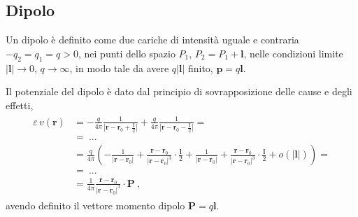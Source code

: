 \documentclass[letterpaper,10pt,italian]{jupyterBook}
\begin{document}
\subsection{Dipolo}
\label{\detokenize{ch/numerical-methods:dipolo}}
\sphinxAtStartPar
Un dipolo è definito come due cariche di intensità uguale e contraria \(-q_2 = q_1 = q > 0\), nei punti dello spazio \(P_1\), \(P_2 = P_1 + \mathbf{l}\), nelle condizioni limite \(|\mathbf{l}| \rightarrow 0\), \(q \rightarrow \infty\), in modo tale da avere \(q |\mathbf{l}|\) finito, \(\mathbf{p} = q \mathbf{l}\).

\sphinxAtStartPar
Il potenziale del dipolo è dato dal principio di sovrapposizione delle cause e degli effetti,
\begin{equation*}
\begin{split}\begin{aligned}
  \varepsilon \, v(\mathbf{r})
  & = - \frac{q}{4 \pi }\frac{1}{\left|\mathbf{r} - \mathbf{r}_0 + \frac{\mathbf{l}}{2} \right|} 
      + \frac{q}{4 \pi }\frac{1}{\left|\mathbf{r} - \mathbf{r}_0 - \frac{\mathbf{l}}{2} \right|} = \\
  & = \ ... \\
  & = \frac{q}{4 \pi} \left( 
  - \frac{1}{\left|\mathbf{r} - \mathbf{r}_0 \right|} + \frac{\mathbf{r} - \mathbf{r}_0}{\left|\mathbf{r} - \mathbf{r}_0 \right|^3} \cdot \frac{\mathbf{l}}{2}
  + \frac{1}{\left|\mathbf{r} - \mathbf{r}_0 \right|} + \frac{\mathbf{r} - \mathbf{r}_0}{\left|\mathbf{r} - \mathbf{r}_0 \right|^3} \cdot \frac{\mathbf{l}}{2} + o(|\mathbf{l}|) \right) = \\
  & = \ ... \\
  & = \frac{1}{4 \pi}
 \frac{\mathbf{r} - \mathbf{r}_0}{\left|\mathbf{r} - \mathbf{r}_0 \right|^3} \cdot \mathbf{P} \ ,
\end{aligned}\end{split}
\end{equation*}
\sphinxAtStartPar
avendo definito il vettore momento dipolo \(\mathbf{P} = q \mathbf{l}\).
\end{document}
